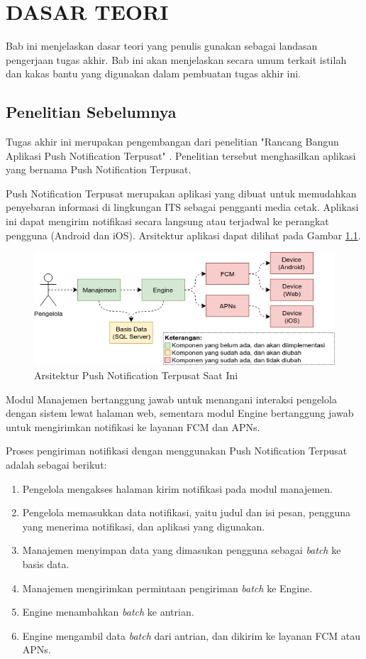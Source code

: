 \chapter{DASAR TEORI}
\par Bab ini menjelaskan dasar teori yang penulis gunakan sebagai landasan pengerjaan tugas akhir. Bab ini akan menjelaskan secara umum terkait istilah dan kakas bantu yang digunakan dalam pembuatan tugas akhir ini.

\section{Penelitian Sebelumnya}
\par Tugas akhir ini merupakan pengembangan dari penelitian "Rancang Bangun Aplikasi Push Notification Terpusat" \cite{application-thesis}. Penelitian tersebut menghasilkan aplikasi yang bernama Push Notification Terpusat.
\par Push Notification Terpusat merupakan aplikasi yang dibuat untuk memudahkan penyebaran informasi di lingkungan ITS sebagai pengganti media cetak. Aplikasi ini dapat mengirim notifikasi secara langsung atau terjadwal ke perangkat pengguna (Android dan iOS). Arsitektur aplikasi dapat dilihat pada Gambar \ref{img:arsitektur-pnt_lama}.
\begin{figure}[H]
	\centering\includegraphics[width=1\textwidth]{bab2/img/arsitektur-push_notification_terpusat_lama.jpg}
	\caption{Arsitektur Push Notification Terpusat Saat Ini}
	\label{img:arsitektur-pnt_lama}
\end{figure}
\par Modul Manajemen bertanggung jawab untuk menangani interaksi pengelola dengan sistem lewat halaman web, sementara modul Engine bertanggung jawab untuk mengirimkan notifikasi ke layanan FCM dan APNs.
\par Proses pengiriman notifikasi dengan menggunakan Push Notification Terpusat adalah sebagai berikut:
\begin{enumerate}
	\item Pengelola mengakses halaman kirim notifikasi pada modul manajemen.
	\item Pengelola memasukkan data notifikasi, yaitu judul dan isi pesan, pengguna yang menerima notifikasi, dan aplikasi yang digunakan.
	\item Manajemen menyimpan data yang dimasukan pengguna sebagai \textit{batch} ke basis data.
	\item Manajemen mengirimkan permintaan pengiriman \textit{batch} ke Engine.
	\item Engine menambahkan \textit{batch} ke antrian.
	\item Engine mengambil data \textit{batch} dari antrian, dan dikirim ke layanan FCM atau APNs.
\end{enumerate}
